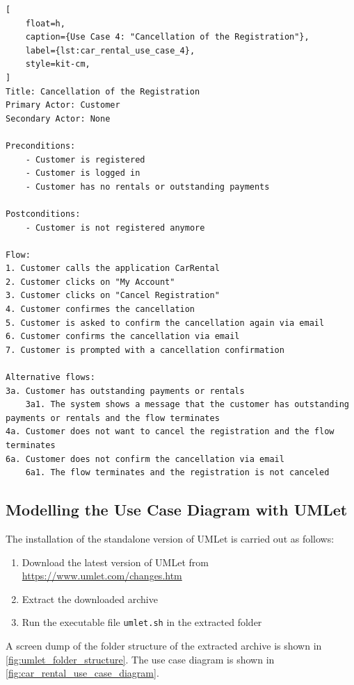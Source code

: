 \begin{lstlisting}[
    float=h,
    caption={Use Case 4: "Cancellation of the Registration"},
    label={lst:car_rental_use_case_4},
    style=kit-cm,
]
Title: Cancellation of the Registration
Primary Actor: Customer
Secondary Actor: None

Preconditions:
    - Customer is registered
    - Customer is logged in
    - Customer has no rentals or outstanding payments

Postconditions:
    - Customer is not registered anymore

Flow:
1. Customer calls the application CarRental
2. Customer clicks on "My Account"
3. Customer clicks on "Cancel Registration"
4. Customer confirmes the cancellation
5. Customer is asked to confirm the cancellation again via email
6. Customer confirms the cancellation via email
7. Customer is prompted with a cancellation confirmation

Alternative flows:
3a. Customer has outstanding payments or rentals
    3a1. The system shows a message that the customer has outstanding payments or rentals and the flow terminates
4a. Customer does not want to cancel the registration and the flow terminates
6a. Customer does not confirm the cancellation via email
    6a1. The flow terminates and the registration is not canceled
\end{lstlisting}

\subsection*{Modelling the Use Case Diagram with UMLet}
The installation of the standalone version of UMLet is carried out as follows:
\begin{enumerate}
    \item Download the latest version of UMLet from \url{https://www.umlet.com/changes.htm}
    \item Extract the downloaded archive
    \item Run the executable file \texttt{umlet.sh} in the extracted folder
\end{enumerate}

A screen dump of the folder structure of the extracted archive is shown in \autoref{fig:umlet_folder_structure}.
The use case diagram is shown in \autoref{fig:car_rental_use_case_diagram}.


